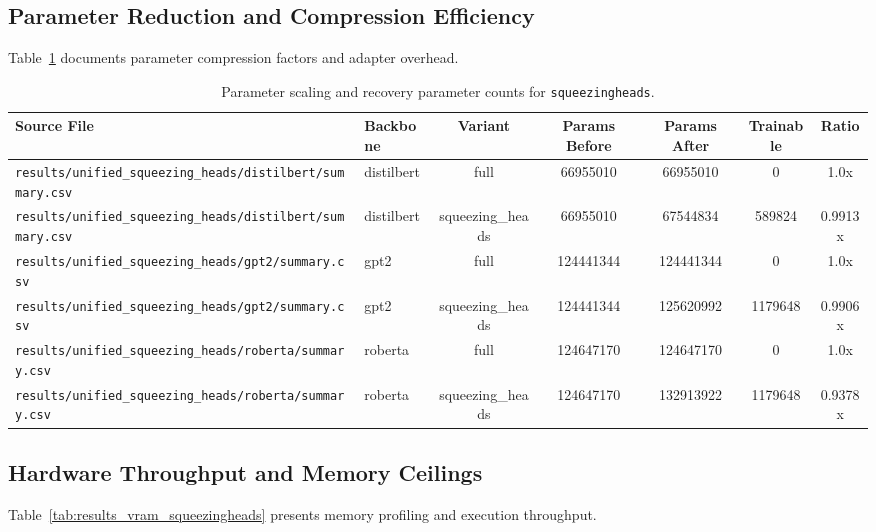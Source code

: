 \subsection{Parameter Reduction and Compression Efficiency}
Table~\ref{tab:results_params_squeezingheads} documents parameter compression factors and adapter overhead.

\begin{table}[t]
\centering
\small
\begin{tabular}{llccccc}
\toprule
\textbf{Source File} & \textbf{Backbone} & \textbf{Variant} & \textbf{Params Before} & \textbf{Params After} & \textbf{Trainable} & \textbf{Ratio} \\
\midrule
\texttt{results/unified\_squeezing\_heads/distilbert/summary.csv} & distilbert & full & 66955010 & 66955010 & 0 & 1.0x \\
\texttt{results/unified\_squeezing\_heads/distilbert/summary.csv} & distilbert & squeezing\_heads & 66955010 & 67544834 & 589824 & 0.9913x \\
\texttt{results/unified\_squeezing\_heads/gpt2/summary.csv} & gpt2 & full & 124441344 & 124441344 & 0 & 1.0x \\
\texttt{results/unified\_squeezing\_heads/gpt2/summary.csv} & gpt2 & squeezing\_heads & 124441344 & 125620992 & 1179648 & 0.9906x \\
\texttt{results/unified\_squeezing\_heads/roberta/summary.csv} & roberta & full & 124647170 & 124647170 & 0 & 1.0x \\
\texttt{results/unified\_squeezing\_heads/roberta/summary.csv} & roberta & squeezing\_heads & 124647170 & 132913922 & 1179648 & 0.9378x \\
\bottomrule
\end{tabular}
\caption{Parameter scaling and recovery parameter counts for \texttt{squeezingheads}.}
\label{tab:results_params_squeezingheads}
\end{table}

\subsection{Hardware Throughput and Memory Ceilings}
Table~\ref{tab:results_vram_squeezingheads} presents memory profiling and execution throughput.


